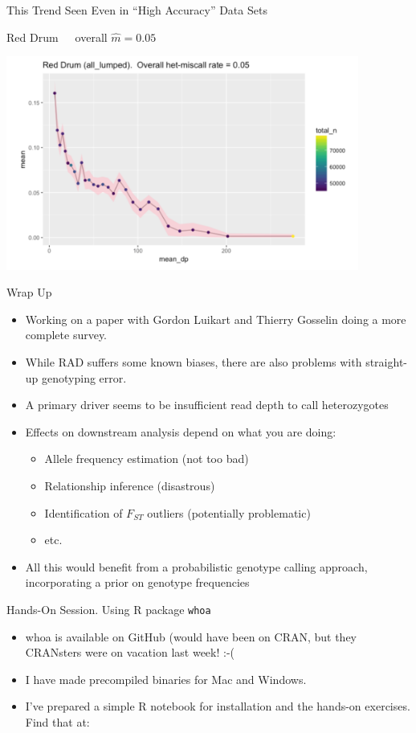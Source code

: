 \documentclass[letter,graphicx]{beamer}
\begin{document}
\begin{frame}{This Trend Seen Even in ``High Accuracy'' Data Sets}

\begin{center}
Red Drum~~~overall $\hat{m} = 0.05$
\vspace*{1.5em}

\includegraphics[width=0.87\textwidth]{./images/red-drum-dp.png}
\end{center}
\end{frame}




\begin{frame}{Wrap Up}
\begin{itemize}
\item Working on a paper with Gordon Luikart and Thierry Gosselin doing a 
more complete survey.  
\item While RAD suffers some known biases, there are also problems
with straight-up genotyping error.
\item A primary driver seems to be insufficient read depth to call heterozygotes
\item Effects on downstream analysis depend on what you are doing:
\begin{itemize}
\item Allele frequency estimation (not too bad)
\item Relationship inference (disastrous)
\item Identification of $F_{ST}$ outliers (potentially problematic)
\item etc.
\end{itemize}
\item All this would benefit from a probabilistic genotype calling approach, incorporating a prior on 
genotype frequencies
\end{itemize}
\end{frame}




\begin{frame}{Hands-On Session.  Using R package {\tt whoa}}
\begin{itemize}
\item whoa is available on GitHub (would have been on CRAN, but they CRANsters were on vacation last week!  :-(
\item I have made precompiled binaries for Mac and Windows.
\item I've prepared a simple R notebook for installation and the hands-on exercises. Find that at:
 
\end{itemize}
\end{frame}
\end{document}
